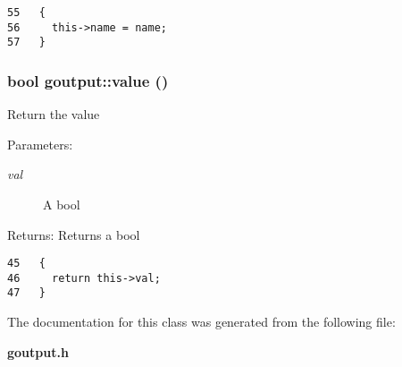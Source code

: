 \begin{Code}\begin{verbatim}55   {
56     this->name = name;
57   }
\end{verbatim}\end{Code}


\subsubsection{\setlength{\rightskip}{0pt plus 5cm}bool goutput::value ()\hspace{0.3cm}{\tt  [inline]}}\label{classgoutput_e4840e1ff1d82fd27aa0076d64ae89ad}


Return the value

\begin{Desc}
\item[Parameters:]
\begin{description}
\item[{\em val}]A bool \end{description}
\end{Desc}
\begin{Desc}
\item[Returns:]Returns a bool \end{Desc}


\begin{Code}\begin{verbatim}45   {
46     return this->val;
47   }  
\end{verbatim}\end{Code}




The documentation for this class was generated from the following file:\begin{CompactItemize}
\item 
\bf{goutput.h}\end{CompactItemize}
